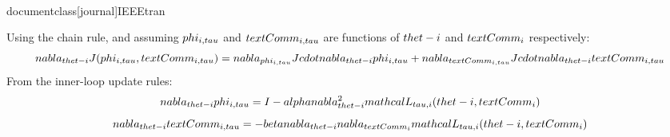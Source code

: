 \\documentclass[journal]{IEEEtran}
\begin{document}
Using the chain rule, and assuming $\\phi_{i,\\tau}$ and $\\text{Comm}_{i,\\tau}$ are functions of $\\thet-i$ and $\\text{Comm}_i$ respectively:
$$ \\nabla_{\\thet-i} J(\\phi_{i,\\tau}, \\text{Comm}_{i,\\tau}) = \\nabla_{\\phi_{i,\\tau}} J \\cdot \\nabla_{\\thet-i} \\phi_{i,\\tau} + \\nabla_{\\text{Comm}_{i,\\tau}} J \\cdot \\nabla_{\\thet-i} \\text{Comm}_{i,\\tau} $$
From the inner-loop update rules:
$$ \\nabla_{\\thet-i} \\phi_{i,\\tau} = I - \\alpha \\nabla_{\\thet-i}^2 \\mathcal{L}_{\\tau,i}(\\thet-i, \\text{Comm}_i) $$
$$ \\nabla_{\\thet-i} \\text{Comm}_{i,\\tau} = - \\beta \\nabla_{\\thet-i} \\nabla_{\\text{Comm}_i} \\mathcal{L}_{\\tau,i}(\\thet-i, \\text{Comm}_i) $$
\end{document}
